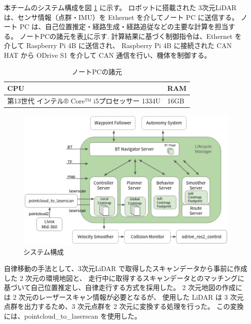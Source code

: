 \documentclass[twocolumn,9pt]{jsproceedings}
\begin{document}
本チームのシステム構成を図 \ref{fig:shinsotu_system_diagram} に示す。
ロボットに搭載された 3次元LiDAR は、センサ情報（点群・IMU）を Ethernet を介してノート PC に送信する。
ノート PC は、自己位置推定・経路生成・経路追従などの主要な計算を担当する。
ノートPCの諸元を表\ref{table:laptop}に示す. 
計算結果に基づく制御指令は、Ethernet を介して Raspberry Pi 4B に送信され、
Raspberry Pi 4B に接続された CAN HAT から ODrive S1 を介して CAN 通信を行い、機体を制御する。

\begin{table}[H]
  \centering
  \caption{ノートPCの諸元}
  \label{table:laptop}
	  \begin{tabular}{|p{7.0cm}|l|}
    \hline
    CPU & RAM\\ 
    \hline
    第13世代 インテル® Core™ i5プロセッサー 1334U  & 16GB \\ 
    \hline
  \end{tabular}
\end{table}

\begin{figure}[h]
  \begin{center}
    \includegraphics[width=1.0\linewidth]{figs/shinsotu_system_diagram.pdf}
    \caption{システム構成 \cite{nav2_docs}}
    \label{fig:shinsotu_system_diagram}
  \end{center}
\end{figure}

自律移動の手法として、3次元LiDAR で取得したスキャンデータから事前に作成した 2 次元の環境地図と、
走行中に取得するスキャンデータとのマッチングに基づいて自己位置推定し、自律走行する方式を採用した。
2 次元地図の作成には 2 次元のレーザースキャン情報が必要となるが、
使用した LiDAR は 3 次元点群を出力するため、3 次元点群を 2 次元に変換する処理を行った。
この変換には、pointcloud\_to\_laserscan \cite{pcl_lsc} を使用した。
\end{document}

